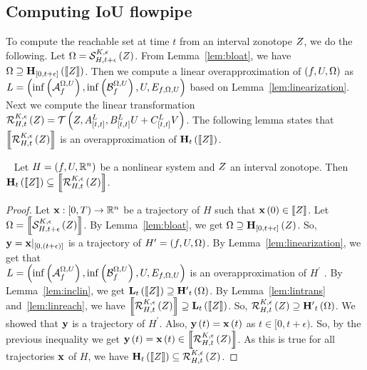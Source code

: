 \subsection{Computing IoU flowpipe}
To compute the reachable set at time $t$ from an interval zonotope
$Z$, we do the following.  Let $\Omega
= \mathcal{S}_{H,t+\epsilon}^{K,\epsilon}\left(Z\right)$.  From Lemma~\ref{lem:bloat}, we
have $\Omega\supseteq\mathbf{H}_{[0,t+\epsilon]}\left(\left\llbracket{Z}\right\rrbracket\right)$.
Then we
compute a linear overapproximation of $\left(f,U,\Omega\right)$ as\\ $L
= \left(\inf\left(\mathcal{A}_{f}^{\Omega,U}\right),
\inf\left(\mathcal{B}_{f}^{\Omega,U}\right),
U,
E_{f,\Omega,U}
\right)$ based on Lemma~\ref{lem:linearization}.  Next we compute the linear transformation
%
$
\mathcal{R}_{H,t}^{K,\epsilon}\left(Z\right)
= \mathcal{T}\left(Z, {A}^{L}_{[t,t]},{B}^{L}_{[t,t]}U
+ {C}^{L}_{[t,t]}V \right)
$.
%
The following lemma states that $\left\llbracket{\mathcal{R}_{H,t}^{K,\epsilon}\left(Z\right)
}\right\rrbracket$ is an overapproximation of $\mathbf{H}_{t}\left(\left\llbracket{Z}\right\rrbracket\right)$.
%
\begin{lemma}~\label{lem:reachnonlin}
Let $H = \left(f,U,\mathbb{R}^n\right)$ be a nonlinear system and $Z$ an
interval zonotope.  Then
$\mathbf{H}_{t}\left(\left\llbracket{Z}\right\rrbracket\right) \subseteq \left\llbracket{\mathcal{R}_{H,t}^{K,\epsilon}\left(Z\right)}\right\rrbracket$.
\end{lemma}
%
\begin{proof}
Let $\mathbf{x}:[0,T)\rightarrow \mathbb{R}^n$ be a trajectory of $H$ such
that $\mathbf{x}\left(0\right)\in\left\llbracket{Z}\right\rrbracket$.  Let $\Omega
= \left\llbracket{\mathcal{S}_{H,t+\epsilon}^{K,\epsilon}\left(Z\right)}\right\rrbracket$.  By
Lemma~\ref{lem:bloat}, we get $\Omega\supseteq\mathbf{H}_{[0,t+\epsilon]}\left(Z\right)$.  So,
$\mathbf{y} = \mathbf{x}|_{[0,(t+\epsilon)]}$ is a trajectory of $H^\prime
= \left(f,U,\Omega\right)$.  By Lemma~\ref{lem:linearization}, we get that\\ $L
= \left(\inf\left(\mathcal{A}_{f}^{\Omega,U}\right),
\inf\left(\mathcal{B}_{f}^{\Omega,U}\right),
U,
E_{f,\Omega,U}
\right)$ is an overapproximation of $H^\prime$ .  By Lemma~\ref{lem:inclin},
we get
$\mathbf{L}_{t}\left(\left\llbracket{Z}\right\rrbracket\right)\supseteq\mathbf{H^\prime}_{t}\left(\Omega\right)$.  By
Lemma~\ref{lem:lintrans} and~\ref{lem:linreach}, we have
$\left\llbracket{\mathcal{R}_{H,t}^{K,\epsilon}\left(Z\right)}\right\rrbracket \supseteq \mathbf{L}_{t}\left(\left\llbracket{Z}\right\rrbracket\right)$.
So,
$\mathcal{R}_{H,t}^{K,\epsilon}\left(Z\right)\supseteq\mathbf{H^\prime}_{t}\left(\Omega\right)$.
We showed that $\mathbf{y}$ is a trajectory of $H^\prime$. Also,
$\mathbf{y}\left(t\right) =\mathbf{x}\left(t\right)$ as $t\in[0,t+\epsilon)$.  So, by the previous
inequality we get $\mathbf{y}\left(t\right)
= \mathbf{x}\left(t\right)\in\left\llbracket{\mathcal{R}_{H,t}^{K,\epsilon}\left(Z\right)}\right\rrbracket$.  As this is true
for all trajectories $\mathbf{x}$ of $H$, we have
$\mathbf{H}_{t}\left(\left\llbracket{Z}\right\rrbracket\right)\subseteq\mathcal{R}_{H,t}^{K,\epsilon}\left(Z\right)$.
\end{proof}

